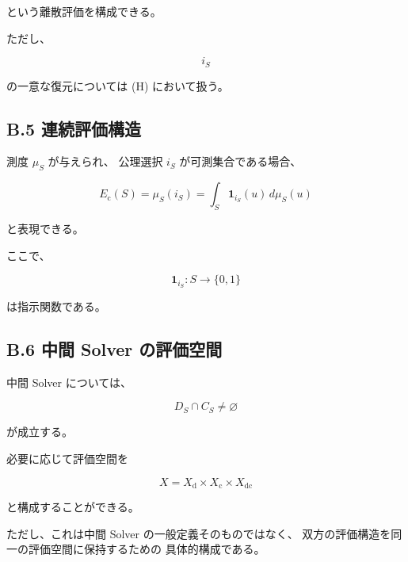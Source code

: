 \documentclass[a4paper,11pt]{article}
\begin{document}
という離散評価を構成できる。

ただし、

\begin{equation}
    i_S
\end{equation}

の一意な復元については (H) において扱う。


\subsection{B.5 連続評価構造}

測度 $\mu_S$ が与えられ、
公理選択 $i_S$ が可測集合である場合、

\begin{equation}
    E_{\mathrm c}(S)
    =
    \mu_S(i_S)
    =
    \int_S
    \mathbf 1_{i_S}(u)\,d\mu_S(u)
\end{equation}

と表現できる。

ここで、

\begin{equation}
    \mathbf1_{i_S}:S\to\{0,1\}
\end{equation}

は指示関数である。


\subsection{B.6 中間 Solver の評価空間}

中間 Solver については、

\begin{equation}
    D_S\cap C_S\neq\varnothing
\end{equation}

が成立する。

必要に応じて評価空間を

\begin{equation}
    X
    =
    X_{\mathrm d}
    \times
    X_{\mathrm c}
    \times
    X_{\mathrm{dc}}
\end{equation}

と構成することができる。

ただし、これは中間 Solver の一般定義そのものではなく、
双方の評価構造を同一の評価空間に保持するための
具体的構成である。

\end{document}
